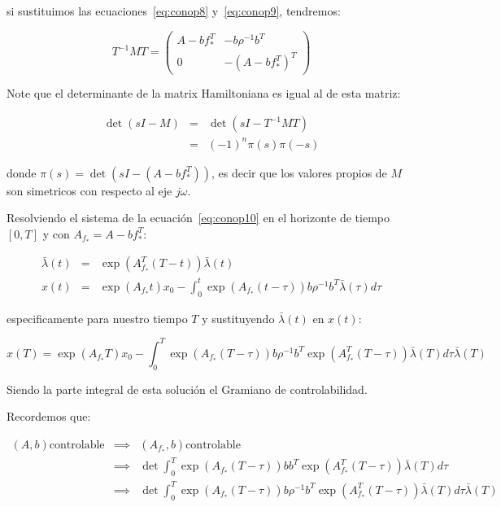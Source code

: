         si sustituimos las ecuaciones~\ref{eq:conop8} y~\ref{eq:conop9}, tendremos:

        \begin{equation*}
            T^{-1} M T =
            \begin{pmatrix}
                A - b f_*^T & - b \rho^{-1} b^T \\
                0 & -(A - b f_*^T)^T
            \end{pmatrix}
        \end{equation*}

        \begin{nota}
            Note que el determinante de la matrix Hamiltoniana es igual al de esta matriz:

            \begin{eqnarray*}
                \det{(sI - M)} & = & \det{(sI - T^{-1}MT)} \\
                 & = & (-1)^n \pi(s) \pi(-s)
            \end{eqnarray*}

            donde $\pi(s) = \det{(sI - (A - b f_*^T))}$, es decir que los valores propios de $M$ son simetricos con respecto al eje $j\omega$.
        \end{nota}

        Resolviendo el sistema de la ecuación~\ref{eq:conop10} en el horizonte de tiempo $[0, T]$ y con $A_{f_*} = A - b f_*^T$:

        \begin{eqnarray}
            \bar{\lambda}(t) & = & \exp{(A_{f_*}^T (T - t))} \bar{\lambda}(t) \\
            x(t) & = & \exp{(A_{f_*} t)} x_0 - \int_0^t \exp{(A_{f_*}(t - \tau))} b \rho^{-1} b^T \bar{\lambda}(\tau) d\tau \nonumber
        \end{eqnarray}

        especificamente para nuestro tiempo $T$ y sustituyendo $\bar{\lambda}(t)$ en $x(t)$:

        \begin{equation*}
            x(T) = \exp{(A_{f_*} T)} x_0 - \int_0^T \exp{(A_{f_*}(T - \tau))} b \rho^{-1} b^T \exp{(A_{f_*}^T (T - \tau))} \bar{\lambda}(T) d\tau \bar{\lambda}(T)
        \end{equation*}

        Siendo la parte integral de esta solución el Gramiano de controlabilidad.

        Recordemos que:

        \begin{eqnarray*}
            (A, b) \text{controlable} & \implies & (A_{f_*}, b) \text{controlable} \\
            & \implies & \det{\int_0^T \exp{(A_{f_*}(T - \tau))} b b^T \exp{(A_{f_*}^T (T - \tau))} \bar{\lambda}(T) d\tau} \\
            & \implies & \det{\int_0^T \exp{(A_{f_*}(T - \tau))} b \rho^{-1} b^T \exp{(A_{f_*}^T (T - \tau))} \bar{\lambda}(T) d\tau \bar{\lambda}(T)}
        \end{eqnarray*}

